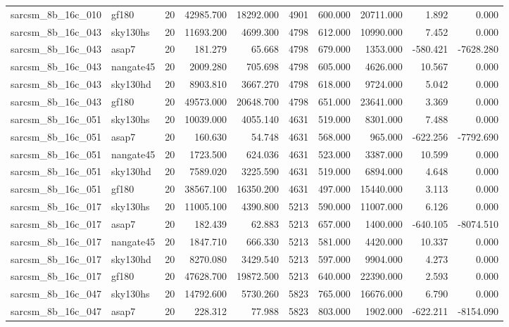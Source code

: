 \documentclass{article}
\begin{document}
\begin{longtable}{llrrrrrrrr}
sarcsm\_8b\_16c\_010 & gf180 & 20 & 42985.700 & 18292.000 & 4901 & 600.000 & 20711.000 & 1.892 & 0.000 \\
sarcsm\_8b\_16c\_043 & sky130hs & 20 & 11693.200 & 4699.300 & 4798 & 612.000 & 10990.000 & 7.452 & 0.000 \\
sarcsm\_8b\_16c\_043 & asap7 & 20 & 181.279 & 65.668 & 4798 & 679.000 & 1353.000 & -580.421 & -7628.280 \\
sarcsm\_8b\_16c\_043 & nangate45 & 20 & 2009.280 & 705.698 & 4798 & 605.000 & 4626.000 & 10.567 & 0.000 \\
sarcsm\_8b\_16c\_043 & sky130hd & 20 & 8903.810 & 3667.270 & 4798 & 618.000 & 9724.000 & 5.042 & 0.000 \\
sarcsm\_8b\_16c\_043 & gf180 & 20 & 49573.000 & 20648.700 & 4798 & 651.000 & 23641.000 & 3.369 & 0.000 \\
sarcsm\_8b\_16c\_051 & sky130hs & 20 & 10039.000 & 4055.140 & 4631 & 519.000 & 8301.000 & 7.488 & 0.000 \\
sarcsm\_8b\_16c\_051 & asap7 & 20 & 160.630 & 54.748 & 4631 & 568.000 & 965.000 & -622.256 & -7792.690 \\
sarcsm\_8b\_16c\_051 & nangate45 & 20 & 1723.500 & 624.036 & 4631 & 523.000 & 3387.000 & 10.599 & 0.000 \\
sarcsm\_8b\_16c\_051 & sky130hd & 20 & 7589.020 & 3225.590 & 4631 & 519.000 & 6894.000 & 4.648 & 0.000 \\
sarcsm\_8b\_16c\_051 & gf180 & 20 & 38567.100 & 16350.200 & 4631 & 497.000 & 15440.000 & 3.113 & 0.000 \\
sarcsm\_8b\_16c\_017 & sky130hs & 20 & 11005.100 & 4390.800 & 5213 & 590.000 & 11007.000 & 6.126 & 0.000 \\
sarcsm\_8b\_16c\_017 & asap7 & 20 & 182.439 & 62.883 & 5213 & 657.000 & 1400.000 & -640.105 & -8074.510 \\
sarcsm\_8b\_16c\_017 & nangate45 & 20 & 1847.710 & 666.330 & 5213 & 581.000 & 4420.000 & 10.337 & 0.000 \\
sarcsm\_8b\_16c\_017 & sky130hd & 20 & 8270.080 & 3429.540 & 5213 & 597.000 & 9904.000 & 4.273 & 0.000 \\
sarcsm\_8b\_16c\_017 & gf180 & 20 & 47628.700 & 19872.500 & 5213 & 640.000 & 22390.000 & 2.593 & 0.000 \\
sarcsm\_8b\_16c\_047 & sky130hs & 20 & 14792.600 & 5730.260 & 5823 & 765.000 & 16676.000 & 6.790 & 0.000 \\
sarcsm\_8b\_16c\_047 & asap7 & 20 & 228.312 & 77.988 & 5823 & 803.000 & 1902.000 & -622.211 & -8154.090 \\

\end{longtable}
\end{document}
